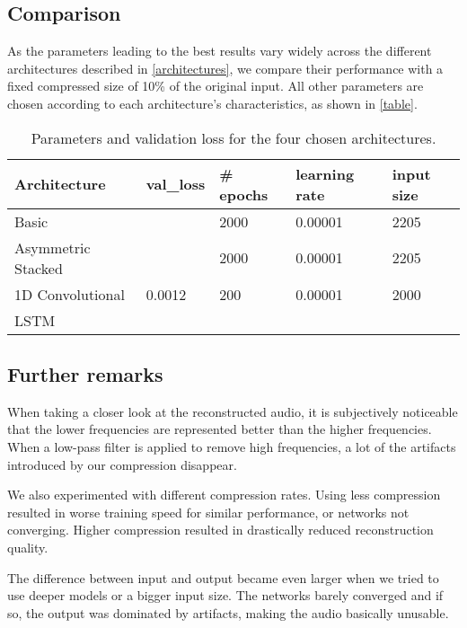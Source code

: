 \documentclass[11pt]{article}
\begin{document}
\subsection{Comparison} 
As the parameters leading to the best results vary widely across the different architectures described in \autoref{architectures}, we compare their performance with a fixed compressed size of 10\% of the original input. All other parameters are chosen according to each architecture's characteristics, as shown in \autoref{table}.
\begin{table}[h!]   \label{table}
\centering
\begin{tabular}{|l|l|l|l|l|}
\hline
\textbf{Architecture}       & \textbf{val\_loss} & \# \textbf{epochs} & \textbf{learning rate} & \textbf{input size}  \\ \hline
Basic              &           & 2000      & 0.00001       & 2205        \\ \hline
Asymmetric Stacked &           & 2000      & 0.00001       & 2205        \\ \hline
1D Convolutional   & 0.0012    & 200       & 0.00001       & 2000        \\ \hline
LSTM               &           &           &               &             \\ \hline
\end{tabular}
\caption{Parameters and validation loss for the four chosen architectures.}
\end{table}

\subsection{Further remarks}\label{further}
When taking a closer look at the reconstructed audio, it is subjectively noticeable that the lower frequencies are represented better than the higher frequencies. When a low-pass filter is applied to remove high frequencies, a lot of the artifacts introduced by our compression disappear. \par
We also experimented with different compression rates. Using less compression resulted in worse training speed for similar performance, or networks not converging. Higher compression resulted in drastically reduced reconstruction quality. \par
The difference between input and output became even larger when we tried to use deeper models or a bigger input size. The networks barely converged and if so, the output was dominated by artifacts, making the audio basically unusable. 
\end{document}
